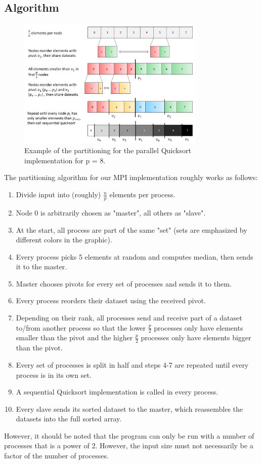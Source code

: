 \documentclass[12pt,a4paper]{article}
\begin{document}
\subsection{Algorithm}
\begin{figure}[h]
	\includegraphics[width=0.8\textwidth]{img/mpi_algorithm.pdf}
	\caption{Example of the partitioning for the parallel Quicksort implementation for p = 8.}
\end{figure}
The partitioning algorithm for our MPI implementation roughly works as follows:
\begin{enumerate}
	\item Divide input into (roughly) $\frac{n}{p}$ elements per process.
	\item Node 0 is arbitrarily chosen as "master", all others as "slave".
	\item At the start, all process are part of the same "set" (sets are emphasized by different colors in the graphic).
	\item Every process picks 5 elements at random and computes median, then sends it to the master.
	\item Master chooses pivots for every set of processes and sends it to them.
	\item Every process reorders their dataset using the received pivot.
	\item Depending on their rank, all processes send and receive part of a dataset to/from another process so that the lower $\frac{p}{2}$ processes only have elements smaller than the pivot and the higher $\frac{p}{2}$ processes only have elements bigger than the pivot.
	\item Every set of processes is split in half and steps 4-7 are repeated until every process is in its own set.
	\item A sequential Quicksort implementation is called in every process.
	\item Every slave sends its sorted dataset to the master, which reassembles the datasets into the full sorted array.
\end{enumerate}
However, it should be noted that the program can only be run with a number of processes that is a power of 2. However, the input size must not necessarily be a factor of the number of processes. 
\end{document}
